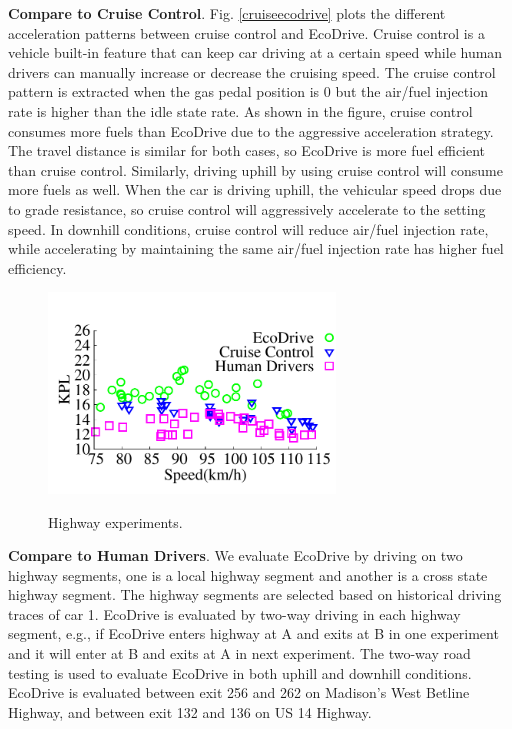 \textbf{Compare to Cruise Control}. 
Fig. \ref{cruiseecodrive} plots the different acceleration patterns between cruise control
and EcoDrive. 
Cruise control is a vehicle built-in feature that can keep car driving
at a certain speed while human drivers can manually increase or decrease the cruising speed. 
The cruise control pattern is extracted when the gas pedal position is 0 but 
the air/fuel injection rate is higher than the idle state rate.  
As shown in the figure, cruise control consumes more
fuels than EcoDrive due to the aggressive acceleration strategy. 
The travel distance is similar for both cases, so EcoDrive is more fuel
efficient than cruise control. 
Similarly, driving uphill by using cruise control will consume more fuels as well. 
When the car is driving uphill, the vehicular speed drops due to grade resistance,
so cruise control will aggressively accelerate to the setting speed. 
In downhill conditions, cruise control will reduce air/fuel injection rate, 
while accelerating by maintaining the same air/fuel injection
rate has higher fuel efficiency. 


\begin{figure}[!htbp]
\begin{center}
\vspace{-0.4cm}
\includegraphics[width=3.0in,angle=0]{Figs/EcoDrive/evaluation/highway_ecodrive.pdf}
\vspace{-0.0cm}
\caption{Highway experiments.}
\vspace{-0.6cm}
\label{ecodrive_highway}
\end{center}
\end{figure}


\textbf{Compare to Human Drivers}. 
We evaluate EcoDrive by driving on two highway segments, 
one is a local highway segment and another is a cross state highway segment.  
The highway segments are selected based on historical driving traces of car 1. 
EcoDrive is evaluated by two-way driving in each highway segment, 
e.g., if EcoDrive enters highway at A and exits at B in one experiment
and it will enter at B and exits at A in next experiment.  
The two-way road testing is used to evaluate EcoDrive in both uphill
and downhill conditions. 
EcoDrive is evaluated between exit 256 and 262 on Madison's West Betline Highway, 
and between exit 132 and 136 on US 14 Highway.

